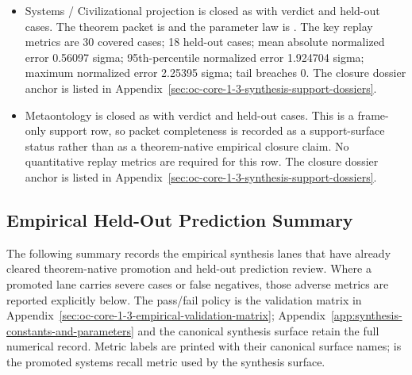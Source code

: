 \begin{itemize}[leftmargin=1.6em,nosep]
\item Systems / Civilizational projection is closed as  with verdict  and  held-out cases. The theorem packet is  and the parameter law is . The key replay metrics are 30 covered cases; 18 held-out cases; mean absolute normalized error 0.56097 sigma; 95th-percentile normalized error 1.924704 sigma; maximum normalized error 2.25395 sigma; tail breaches 0. The closure dossier anchor is listed in Appendix~\ref{sec:oc-core-1-3-synthesis-support-dossiers}.
\item Metaontology is closed as  with verdict  and  held-out cases. This is a frame-only support row, so packet completeness is recorded as a support-surface status rather than as a theorem-native empirical closure claim. No quantitative replay metrics are required for this row. The closure dossier anchor is listed in Appendix~\ref{sec:oc-core-1-3-synthesis-support-dossiers}.
\end{itemize}

\subsection{Empirical Held-Out Prediction Summary}
The following summary records the empirical synthesis lanes that have already cleared theorem-native promotion and held-out prediction review.
Where a promoted lane carries severe cases or false negatives, those adverse metrics are reported explicitly below. The pass/fail policy is the validation matrix in Appendix~\ref{sec:oc-core-1-3-empirical-validation-matrix}; Appendix~\ref{app:synthesis-constants-and-parameters} and the canonical synthesis surface retain the full numerical record.
Metric labels are printed with their canonical surface names;  is the promoted systems recall metric used by the synthesis surface.

